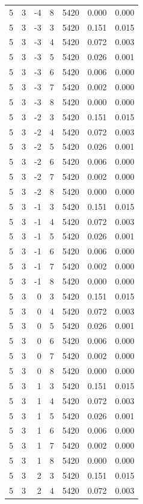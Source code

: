 \begin{table}
\begin{tabular}{rrrrrrr}
5 & 3 & -4 & 8 & 5420 & 0.000 & 0.000 \\
5 & 3 & -3 & 3 & 5420 & 0.151 & 0.015 \\
5 & 3 & -3 & 4 & 5420 & 0.072 & 0.003 \\
5 & 3 & -3 & 5 & 5420 & 0.026 & 0.001 \\
5 & 3 & -3 & 6 & 5420 & 0.006 & 0.000 \\
5 & 3 & -3 & 7 & 5420 & 0.002 & 0.000 \\
5 & 3 & -3 & 8 & 5420 & 0.000 & 0.000 \\
5 & 3 & -2 & 3 & 5420 & 0.151 & 0.015 \\
5 & 3 & -2 & 4 & 5420 & 0.072 & 0.003 \\
5 & 3 & -2 & 5 & 5420 & 0.026 & 0.001 \\
5 & 3 & -2 & 6 & 5420 & 0.006 & 0.000 \\
5 & 3 & -2 & 7 & 5420 & 0.002 & 0.000 \\
5 & 3 & -2 & 8 & 5420 & 0.000 & 0.000 \\
5 & 3 & -1 & 3 & 5420 & 0.151 & 0.015 \\
5 & 3 & -1 & 4 & 5420 & 0.072 & 0.003 \\
5 & 3 & -1 & 5 & 5420 & 0.026 & 0.001 \\
5 & 3 & -1 & 6 & 5420 & 0.006 & 0.000 \\
5 & 3 & -1 & 7 & 5420 & 0.002 & 0.000 \\
5 & 3 & -1 & 8 & 5420 & 0.000 & 0.000 \\
5 & 3 & 0 & 3 & 5420 & 0.151 & 0.015 \\
5 & 3 & 0 & 4 & 5420 & 0.072 & 0.003 \\
5 & 3 & 0 & 5 & 5420 & 0.026 & 0.001 \\
5 & 3 & 0 & 6 & 5420 & 0.006 & 0.000 \\
5 & 3 & 0 & 7 & 5420 & 0.002 & 0.000 \\
5 & 3 & 0 & 8 & 5420 & 0.000 & 0.000 \\
5 & 3 & 1 & 3 & 5420 & 0.151 & 0.015 \\
5 & 3 & 1 & 4 & 5420 & 0.072 & 0.003 \\
5 & 3 & 1 & 5 & 5420 & 0.026 & 0.001 \\
5 & 3 & 1 & 6 & 5420 & 0.006 & 0.000 \\
5 & 3 & 1 & 7 & 5420 & 0.002 & 0.000 \\
5 & 3 & 1 & 8 & 5420 & 0.000 & 0.000 \\
5 & 3 & 2 & 3 & 5420 & 0.151 & 0.015 \\
5 & 3 & 2 & 4 & 5420 & 0.072 & 0.003 \\

\end{tabular}
\end{table}
